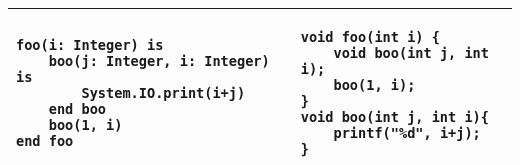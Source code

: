 \begin{center}
\begin{tabular}{ | l | l | }
\begin{lstlisting}
foo(i: Integer) is
    boo(j: Integer, i: Integer) is 
        System.IO.print(i+j)
    end boo
    boo(1, i)
end foo
\end{lstlisting} & 
\begin{lstlisting}
void foo(int i) {
    void boo(int j, int i);
    boo(1, i);
}
void boo(int j, int i){
    printf("%d", i+j);
}
\end{lstlisting} \\ \hline
\end{tabular}
\end{center}